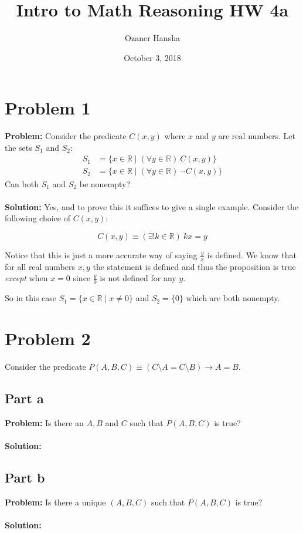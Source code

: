 \documentclass{article}
\begin{document}
\title{Intro to Math Reasoning HW 4a}
\author{Ozaner Hansha}
\date{October 3, 2018}
\maketitle

\section*{Problem 1}
\textbf{Problem:} Consider the predicate $C(x,y)$ where $x$ and $y$ are real numbers. Let the sets $S_1$ and $S_2$:
\begin{align*}
S_1&=\{x\in\mathbb R\mid(\forall y\in\mathbb R)\ C(x,y)\}\\
S_2&=\{x\in\mathbb R\mid(\forall y\in\mathbb R)\ \neg C(x,y)\}
\end{align*}
Can both $S_1$ and $S_2$ be nonempty?
\\\\
\textbf{Solution:} Yes, and to prove this it suffices to give a single example. Consider the following choice of $C(x,y)$:

$$C(x,y)\equiv (\exists! k\in\mathbb R)\ kx=y$$

Notice that this is just a more accurate way of saying $\frac{y}{x}$ is defined. We know that for all real numbers $x,y$ the statement is defined and thus the proposition is true \textit{except} when $x=0$ since $\frac{y}{0}$ is not defined for any $y$.

So in this case $S_1=\{x\in\mathbb R\mid x\not=0\}$ and $S_2=\{0\}$ which are both nonempty.

\section*{Problem 2}
Consider the predicate $P(A,B,C)\equiv (C\setminus A=C\setminus B)\rightarrow A=B$.
\subsection*{Part a}
\textbf{Problem:} Is there an $A,B$ and $C$ such that $P(A,B,C)$ is true?
\\\\
\textbf{Solution:}

\subsection*{Part b}
\textbf{Problem:} Is there a unique $(A,B,C)$ such that $P(A,B,C)$ is true?
\\\\
\textbf{Solution:}
\end{document}
